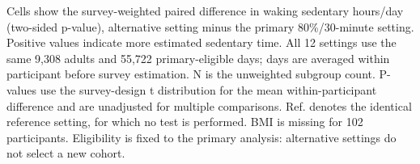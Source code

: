 \documentclass[10pt]{article}
\begin{document}
\par\medskip
\footnotesize Cells show the survey-weighted paired difference in waking sedentary hours/day (two-sided p-value), alternative setting minus the primary 80\%/30-minute setting. Positive values indicate more estimated sedentary time. All 12 settings use the same 9,308 adults and 55,722 primary-eligible days; days are averaged within participant before survey estimation. N is the unweighted subgroup count. P-values use the survey-design t distribution for the mean within-participant difference and are unadjusted for multiple comparisons. Ref. denotes the identical reference setting, for which no test is performed. BMI is missing for 102 participants. Eligibility is fixed to the primary analysis: alternative settings do not select a new cohort.
\endgroup
\end{document}
